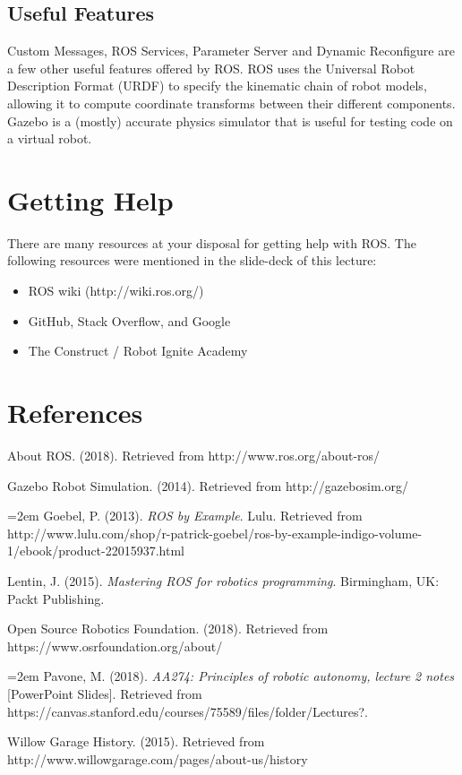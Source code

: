 \documentclass[twoside]{article}
\begin{document}
\subsection{Useful Features}
Custom Messages, ROS Services, Parameter Server and Dynamic Reconfigure are a few other useful features offered by ROS. ROS uses the Universal Robot Description Format (URDF) to specify the kinematic chain of robot models, allowing it to compute coordinate transforms between their different components. Gazebo is a (mostly) accurate physics simulator that is useful for testing code on a virtual robot.
\section{Getting Help}

There are many resources at your disposal for getting help with ROS. The following resources were mentioned in the slide-deck of this lecture:

\begin{itemize}
\item ROS wiki (http://wiki.ros.org/)
\item GitHub, Stack Overflow, and Google
\item The Construct / Robot Ignite Academy
\end{itemize}

\section{References}
About ROS. (2018). Retrieved from http://www.ros.org/about-ros/

Gazebo Robot Simulation. (2014). Retrieved from http://gazebosim.org/

\hangindent=2em
Goebel, P. (2013). \textit{ROS by Example}. Lulu. Retrieved from http://www.lulu.com/shop/r-patrick-goebel/ros-by-example-indigo-volume-1/ebook/product-22015937.html

Lentin, J. (2015). {\it Mastering ROS for robotics programming}. Birmingham, UK: Packt Publishing.

Open Source Robotics Foundation. (2018). Retrieved from https://www.osrfoundation.org/about/


\hangindent=2em
Pavone, M. (2018). {\it AA274: Principles of robotic autonomy, lecture 2 notes} [PowerPoint Slides]. Retrieved from https://canvas.stanford.edu/courses/75589/files/folder/Lectures?.

Willow Garage History. (2015). Retrieved from http://www.willowgarage.com/pages/about-us/history
\end{document}

